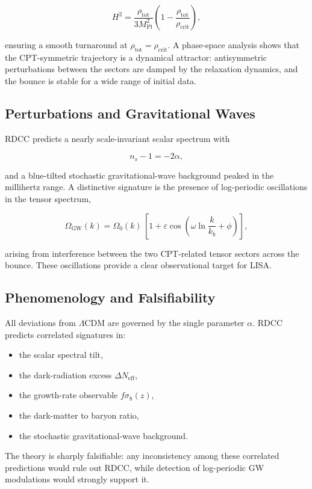 \documentclass[11pt,a4paper]{article}
\begin{document}
\[
H^{2} = \frac{\rho_{\mathrm{tot}}}{3M_{\mathrm{Pl}}^{2}}
        \left(1 - \frac{\rho_{\mathrm{tot}}}{\rho_{\mathrm{crit}}}\right),
\]

ensuring a smooth turnaround at \( \rho_{\mathrm{tot}} = \rho_{\mathrm{crit}} \).
A phase-space analysis shows that the CPT-symmetric trajectory is a dynamical
attractor: antisymmetric perturbations between the sectors are damped by the
relaxation dynamics, and the bounce is stable for a wide range of initial data.

\subsection*{Perturbations and Gravitational Waves}

RDCC predicts a nearly scale-invariant scalar spectrum with

\[
n_{s} - 1 = -2\alpha,
\]

and a blue-tilted stochastic gravitational-wave background peaked in the
millihertz range. A distinctive signature is the presence of log-periodic
oscillations in the tensor spectrum,

\[
\Omega_{\mathrm{GW}}(k)
    = \Omega_{0}(k)\,
      \left[1 + \varepsilon \cos\!\left(\omega \ln\frac{k}{k_{b}} + \phi\right)\right],
\]

arising from interference between the two CPT-related tensor sectors across
the bounce. These oscillations provide a clear observational target for LISA.

\subsection*{Phenomenology and Falsifiability}

All deviations from \(\Lambda\)CDM are governed by the single parameter \( \alpha \).
RDCC predicts correlated signatures in:

\begin{itemize}
    \item the scalar spectral tilt,
    \item the dark-radiation excess \( \Delta N_{\mathrm{eff}} \),
    \item the growth-rate observable \( f\sigma_{8}(z) \),
    \item the dark-matter to baryon ratio,
    \item the stochastic gravitational-wave background.
\end{itemize}

The theory is sharply falsifiable: any inconsistency among these correlated
predictions would rule out RDCC, while detection of log-periodic GW modulations
would strongly support it.
\end{document}
